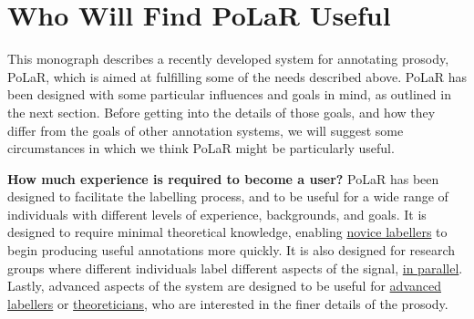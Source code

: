 


\section{Who Will Find PoLaR Useful}\label{sec:who-will-find-polar-useful}

This monograph describes a recently developed system for annotating prosody, PoLaR, which is  aimed at fulfilling some of the needs described above. PoLaR has been designed with some particular influences and goals in mind, as outlined in the next section. Before getting into the details of those goals, and how they differ from the goals of other annotation systems, we will suggest some circumstances in which we think PoLaR might be particularly useful.

\textbf{How much experience is required to become a user?} PoLaR has been designed to facilitate the labelling process, and to be useful for a wide range of individuals with different levels of experience, backgrounds, and goals. It is designed to require minimal theoretical knowledge, enabling \uline{novice labellers} to begin producing useful annotations more quickly. It is also designed for research groups where different individuals label different aspects of the signal, \uline{in parallel}. Lastly, advanced aspects of the system are designed to be useful for \uline{advanced labellers} or \uline{theoreticians}, who are interested in the finer details of the prosody.

